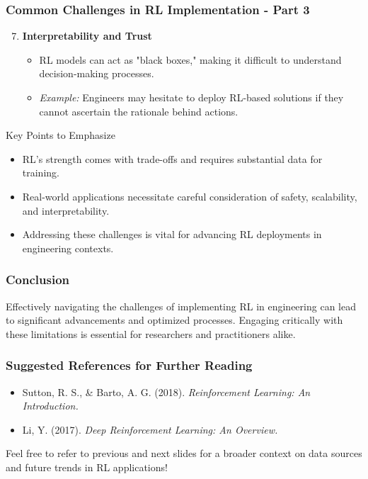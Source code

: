 \documentclass[aspectratio=169]{beamer}
\begin{document}
\begin{frame}[fragile]
    \frametitle{Common Challenges in RL Implementation - Part 3}
    \begin{enumerate}
        \setcounter{enumi}{6}
        \item \textbf{Interpretability and Trust}
        \begin{itemize}
            \item RL models can act as "black boxes," making it difficult to understand decision-making processes.
            \item \textit{Example:} Engineers may hesitate to deploy RL-based solutions if they cannot ascertain the rationale behind actions.
        \end{itemize}
    \end{enumerate}
    
    \begin{block}{Key Points to Emphasize}
        \begin{itemize}
            \item RL's strength comes with trade-offs and requires substantial data for training.
            \item Real-world applications necessitate careful consideration of safety, scalability, and interpretability.
            \item Addressing these challenges is vital for advancing RL deployments in engineering contexts.
        \end{itemize}
    \end{block}
\end{frame}

\begin{frame}[fragile]
    \frametitle{Conclusion}
    Effectively navigating the challenges of implementing RL in engineering can lead to significant advancements and optimized processes. Engaging critically with these limitations is essential for researchers and practitioners alike. 
\end{frame}

\begin{frame}[fragile]
    \frametitle{Suggested References for Further Reading}
    \begin{itemize}
        \item Sutton, R. S., \& Barto, A. G. (2018). \textit{Reinforcement Learning: An Introduction.} 
        \item Li, Y. (2017). \textit{Deep Reinforcement Learning: An Overview.}
    \end{itemize}
    Feel free to refer to previous and next slides for a broader context on data sources and future trends in RL applications!
\end{frame}
\end{document}
